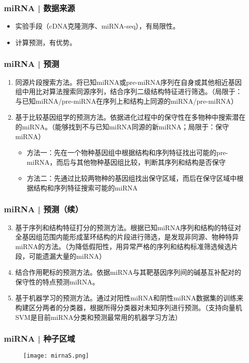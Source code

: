 \begin{frame}
  \frametitle{miRNA | 数据来源}
  \begin{itemize}
    \item 实验手段（cDNA克隆测序、miRNA-seq），有局限性。
    \item 计算预测，有优势。
  \end{itemize}
\end{frame}

\begin{frame}
  \frametitle{miRNA | \alert{预测}}
  \begin{enumerate}
    \item 同源片段搜索方法。将已知miRNA或pre-miRNA序列在自身或其他相近基因组中用比对算法搜索同源序列，结合序列二级结构特征进行筛选。（局限于：与已知miRNA/pre-miRNA在序列上和结构上同源的miRNA/pre-miRNA）
    \item 基于比较基因组学的预测方法。依据进化过程中的保守性在多物种中搜索潜在的miRNA。（能够找到不与已知miRNA同源的新miRNA；局限于：保守miRNA）
      \begin{itemize}
	\item 方法一：先在一个物种基因组中根据结构和序列特征找出可能的pre-miRNA，而后与其他物种基因组比较，判断其序列和结构是否保守
	\item 方法二：先通过比较两物种的基因组找出保守区域，而后在保守区域中根据结构和序列特征搜索可能的miRNA
      \end{itemize}
  \end{enumerate}
\end{frame}

\begin{frame}
  \frametitle{miRNA | \alert{预测}（续）}
  \begin{enumerate}
    \setcounter{enumi}{2}
    \item 基于序列和结构特征打分的预测方法。根据已知miRNA序列和结构的特征对全基因组范围内能形成茎环结构的片段进行筛选，是发现非同源、物种特异miRNA的方法。（为降低假阳性，用异常严格的序列和结构标准筛选候选片段，可能遗漏大量的miRNA）
    \item 结合作用靶标的预测方法。依据miRNA与其靶基因序列间的碱基互补配对的保守性的特点预测miRNA。
    \item 基于机器学习的预测方法。通过对阳性miRNA和阴性miRNA数据集的训练来构建区分两者的分类器，根据所得分类器对未知序列进行预测。（支持向量机SVM是目前miRNA分类和预测最常用的机器学习方法）
  \end{enumerate}
\end{frame}

\begin{frame}
  \frametitle{miRNA | 种子区域}
  \begin{figure}
    \centering
    \texttt{[image: mirnaS.png]}
  \end{figure}
\end{frame}

